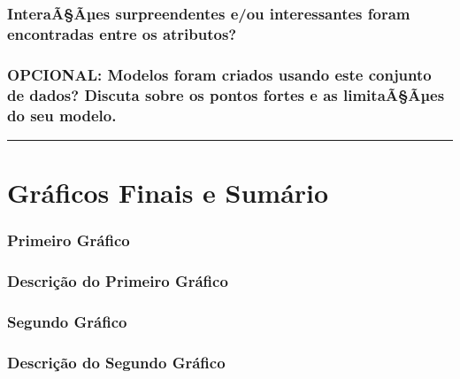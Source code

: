\documentclass[]{article}
\begin{document}
\hypertarget{interaaaes-surpreendentes-eou-interessantes-foram-encontradas-entre-os-atributos}{%
\subsubsection{InteraÃ§Ãµes surpreendentes e/ou interessantes foram
encontradas entre os
atributos?}\label{interaaaes-surpreendentes-eou-interessantes-foram-encontradas-entre-os-atributos}}

\hypertarget{opcional-modelos-foram-criados-usando-este-conjunto-de-dados-discuta-sobre-os-pontos-fortes-e-as-limitaaaes-do-seu-modelo.}{%
\subsubsection{OPCIONAL: Modelos foram criados usando este conjunto de
dados? Discuta sobre os pontos fortes e as limitaÃ§Ãµes do seu
modelo.}\label{opcional-modelos-foram-criados-usando-este-conjunto-de-dados-discuta-sobre-os-pontos-fortes-e-as-limitaaaes-do-seu-modelo.}}

\begin{center}\rule{0.5\linewidth}{\linethickness}\end{center}

\hypertarget{graficos-finais-e-sumario}{%
\section{Gráficos Finais e Sumário}\label{graficos-finais-e-sumario}}

\hypertarget{primeiro-grafico}{%
\subsubsection{Primeiro Gráfico}\label{primeiro-grafico}}

\hypertarget{descricao-do-primeiro-grafico}{%
\subsubsection{Descrição do Primeiro
Gráfico}\label{descricao-do-primeiro-grafico}}

\hypertarget{segundo-grafico}{%
\subsubsection{Segundo Gráfico}\label{segundo-grafico}}

\hypertarget{descricao-do-segundo-grafico}{%
\subsubsection{Descrição do Segundo
Gráfico}\label{descricao-do-segundo-grafico}}
\end{document}
